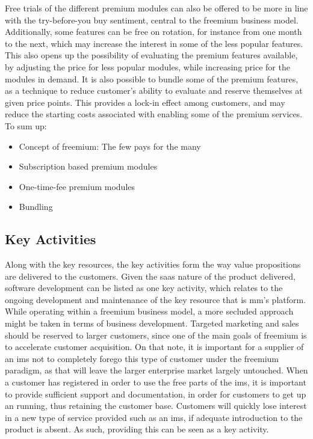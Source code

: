 Free trials of the different premium modules can also be offered to be more in line with the try-before-you buy sentiment, central to the freemium business model. Additionally, some features can be free on rotation, for instance from one month to the next, which may increase the interest in some of the less popular features. This also opens up the possibility of evaluating the premium features available, by adjusting the price for less popular modules, while increasing price for the modules in demand. It is also possible to bundle some of the premium features, as a technique to reduce customer's ability to evaluate and reserve themselves at given price points. This provides a lock-in effect among customers, and may reduce the starting costs associated with enabling some of the premium services. To sum up:

\begin{itemize}
    \item Concept of freemium: The few pays for the many
    \item Subscription based premium modules
    \item One-time-fee premium modules
    \item Bundling
\end{itemize}

\subsection{Key Activities}
Along with the key resources, the key activities form the way value propositions are delivered to the customers. Given the \gls{saas} nature of the product delivered, software development can be listed as one key activity, which relates to the ongoing development and maintenance of the key resource that is \gls{mm}'s platform. While operating within a freemium business model, a more secluded approach might be taken in terms of business development. Targeted marketing and sales should be reserved to larger customers, since one of the main goals of freemium is to accelerate customer acquisition. On that note, it is important for a supplier of an \gls{ims} not to completely forego this type of customer under the freemium paradigm, as that will leave the larger enterprise market largely untouched. When a customer has registered in order to use the free parts of the \gls{ims}, it is important to provide sufficient support and documentation, in order for customers to get up an running, thus retaining the customer base. Customers will quickly lose interest in a new type of service provided such as an \gls{ims}, if adequate introduction to the product is absent. As such, providing this can be seen as a key activity. 



